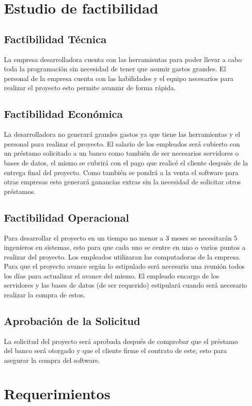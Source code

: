 \documentclass[conference]{IEEEtran}
\begin{document}
\section{Estudio de factibilidad}

\subsection{Factibilidad Técnica}
 
La empresa desarrolladora cuenta con las herramientas para poder llevar a cabo toda la programación sin necesidad de tener que asumir gastos grandes. El personal de la empresa cuenta con las habilidades y el equipo necesarios para realizar el proyecto esto permite avanzar de forma rápida.
\subsection{Factibilidad Económica}
La desarrolladora no generará grandes gastos ya que tiene las herramientas y el personal para realizar el proyecto. El salario de los empleados será cubierto con un préstamo solicitado a un banco como también de ser necesarios servidores o bases de datos, el mismo se cubrirá con el pago que realicé el cliente después de la entrega final del proyecto. Como también se pondrá a la venta el software para otras empresas esto generará ganancias extras sin la necesidad de solicitar otros préstamos. 
\subsection{Factibilidad Operacional} 
Para desarrollar el proyecto en un tiempo no menor a 3 meses se necesitarán 5 ingenieros en sistemas, esto para que cada uno se centre en uno o varios puntos a realizar del proyecto. Los empleados utilizaran las computadoras de la empresa. Para que el proyecto avance según lo estipulado será necesaria una reunión todos los días para actualizar el avance del mismo. El empleado encargo de los servidores y las bases de datos (de ser requerido) estipulará cuando será necesario realizar la compra de estos.
\subsection{Aprobación de la Solicitud}  
La solicitud del proyecto será aprobada después de comprobar que el préstamo del banco será otorgado y que el cliente firme el contrato de este, esto para asegurar la compra del software.


\section{Requerimientos}
\end{document}
